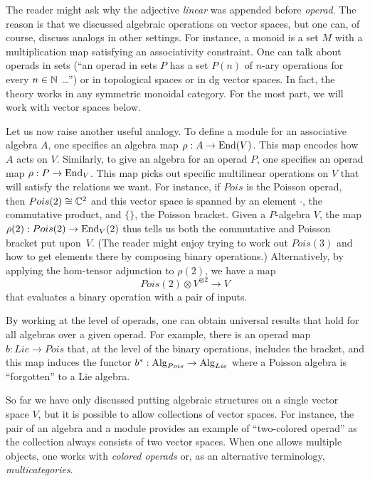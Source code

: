 \documentclass[11pt]{amsart}
\begin{document}
\begin{rmk}
The reader might ask why the adjective {\em linear} was appended before {\em operad}.
The reason is that we discussed algebraic operations on vector spaces,
but one can, of course, discuss analogs in other settings.
For instance, a monoid is a set $M$ with a multiplication map satisfying an associativity constraint.
One can talk about operads in sets (``an operad in sets $P$ has a set $P(n)$ of $n$-ary operations for every $n \in \mathbb N$ \dots'') or in topological spaces or in dg vector spaces.
In fact, the theory works in any symmetric monoidal category. 
For the most part, we will work with vector spaces below.
\end{rmk}

Let us now raise another useful analogy.
To define a module for an associative algebra $A$, one specifies an algebra map $\rho: A \to {\rm End}(V)$.
This map encodes how $A$ acts on $V$.
Similarly, to give an algebra for an operad $P$, one specifies an operad map $\rho: P \to {\rm End}_V$.
This map picks out specific multilinear operations on $V$ that will satisfy the relations we want.
For instance, if $Pois$ is the Poisson operad, then $Pois(2) \cong \mathbb C^2$ and this vector space is spanned by an element $\cdot$, the commutative product, and $\{\}$, the Poisson bracket.
Given a $P$-algebra $V$, the map $\rho(2): Pois(2) \to {\rm End}_V(2)$ thus tells us both the commutative and Poisson bracket put upon~$V$.
(The reader might enjoy trying to work out $Pois(3)$ and how to get elements there by composing binary operations.)
Alternatively, by applying the hom-tensor adjunction to $\rho(2)$, we have a map
\[
Pois(2) \otimes V^{\otimes 2} \to V
\]
that evaluates a binary operation with a pair of inputs.

By working at the level of operads, one can obtain universal results that hold for all algebras over a given operad.
For example, there is an operad map $b: Lie \to Pois$ that, at the level of the binary operations, includes the bracket, 
and this map induces the functor $b^*: {\rm Alg}_{Pois} \to {\rm Alg}_{Lie}$ where a Poisson algebra is ``forgotten'' to a Lie algebra.

So far we have only discussed putting algebraic structures on a single vector space $V$,
but it is possible to allow collections of vector spaces.
For instance, the pair of an algebra and a module provides an example of ``two-colored operad'' as the collection always consists of two vector spaces.
When one allows multiple objects, one works with {\em colored operads} or, as an alternative terminology, {\em multicategories}.
\end{document}
